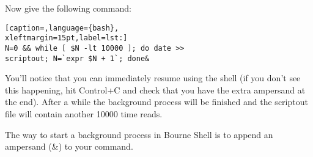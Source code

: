 Now give the following command:

\lstset{basicstyle=\scriptsize, numbers=left, captionpos=b, tabsize=4}
\begin{lstlisting}[caption=,language={bash},
xleftmargin=15pt,label=lst:]
N=0 && while [ $N -lt 10000 ]; do date >>
scriptout; N=`expr $N + 1`; done&
\end{lstlisting}

You'll notice that you can immediately resume using the shell (if you don't see
this happening, hit Control+C and check that you have the extra ampersand at
the end). After a while the background process will be finished and the
scriptout file will contain another 10000 time reads.

The way to start a background process in Bourne Shell is to append an ampersand
(\&) to your command.
